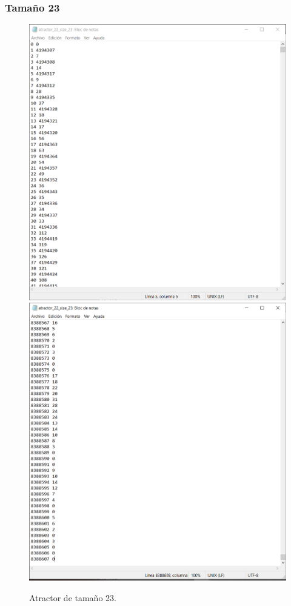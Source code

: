 \documentclass[11pt]{article}
\begin{document}
			\subsubsection{Tamaño 23}
			\begin{figure}[H]
			\centering
			\includegraphics[scale=0.3]{resources/Atractores22/atractor_22_size_23.png}
			\includegraphics[scale=0.3]{resources/Atractores22/atractor_22_size_231.png}
			\caption{Atractor de tamaño 23.}\label{fig:picture}
			\end{figure}
\end{document}
